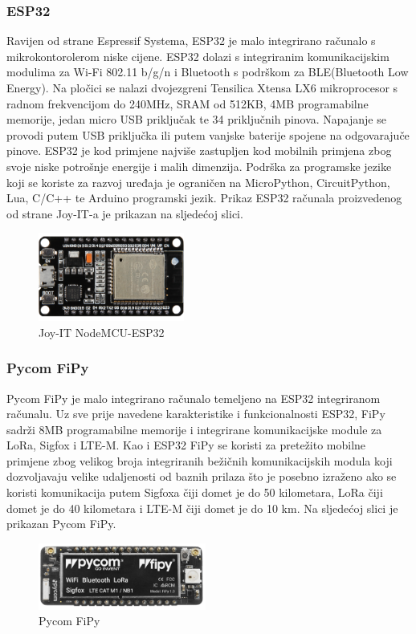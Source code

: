 \documentclass[times, utf8, diplomski]{fer}
\begin{document}
\subsubsection{ESP32}
Ravijen od strane Espressif Systema, ESP32\citep{ESP32} je malo integrirano računalo s mikrokontorolerom niske cijene. ESP32 dolazi s integriranim komunikacijskim modulima za Wi-Fi 802.11 b/g/n i Bluetooth s podrškom za BLE(Bluetooth Low Energy). Na pločici se nalazi dvojezgreni Tensilica Xtensa LX6 mikroprocesor s radnom frekvencijom do 240MHz, SRAM od 512KB, 4MB programabilne memorije, jedan micro USB priključak te 34 priključnih pinova. Napajanje se provodi putem USB priključka ili putem vanjske baterije spojene na odgovarajuče pinove. ESP32 je kod primjene najviše zastupljen kod mobilnih primjena zbog svoje niske potrošnje energije i malih dimenzija. Podrška za programske jezike koji se koriste za razvoj uređaja je ograničen na  MicroPython, CircuitPython, Lua, C/C++ te Arduino programski jezik. Prikaz ESP32 računala proizvedenog od strane Joy-IT-a je prikazan na sljedećoj slici.
\begin{figure}[H]
    \centering
    \includegraphics[width=4.8cm]{images/esp32.png}
    \caption{Joy-IT NodeMCU-ESP32\citep{ESP32Img}}
    \label{fig:esp32}
\end{figure}

\subsubsection{Pycom FiPy}
Pycom FiPy\citep{Fipy} je malo integrirano računalo temeljeno na ESP32 integriranom računalu. Uz sve prije navedene karakteristike i funkcionalnosti ESP32, FiPy sadrži 8MB programabilne memorije i integrirane komunikacijske module za LoRa, Sigfox i LTE-M. Kao i ESP32 FiPy se koristi za pretežito mobilne primjene zbog velikog broja integriranih bežičnih komunikacijskih modula koji dozvoljavaju velike udaljenosti od baznih prilaza što je posebno izraženo ako se koristi komunikacija putem Sigfoxa čiji domet je do 50 kilometara, LoRa čiji domet je do 40 kilometara i LTE-M čiji domet je do 10 km. Na sljedećoj slici je prikazan Pycom FiPy.
\begin{figure}[htb]
    \centering
    \includegraphics[width=5.5cm]{images/fipy.png}
    \caption{Pycom FiPy\citep{Fipy}}
    \label{fig:fipy}
\end{figure}
\end{document}
